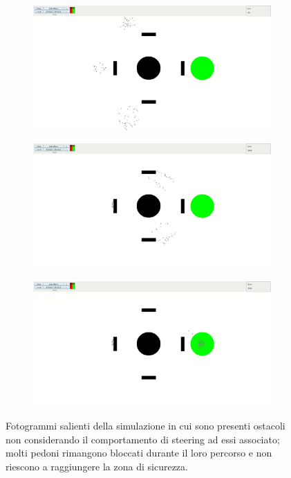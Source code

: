 \begin{figure}
    \centering
    \begin{subfigure}[b]{0.75\textwidth}
        \centering
        \includegraphics[width=\textwidth]{immagini/casi-studio/no-obstacle-avoidance-begin.png}
    \end{subfigure}
    \hfill
    \begin{subfigure}[b]{0.75\textwidth}
        \centering
        \includegraphics[width=\textwidth]{immagini/casi-studio/no-obstacle-avoidance-during.png}
    \end{subfigure}
    \hfill
    \begin{subfigure}[b]{0.75\textwidth}
        \centering
        \includegraphics[width=\textwidth]{immagini/casi-studio/no-obstacle-avoidance-end.png}
    \end{subfigure}
    \caption{Fotogrammi salienti della simulazione in cui sono presenti ostacoli non considerando il comportamento di steering ad essi associato; molti pedoni rimangono bloccati durante il loro percorso e non riescono a raggiungere la zona di sicurezza.}
    \label{fig:no-obstacle-avoidance}
\end{figure}


